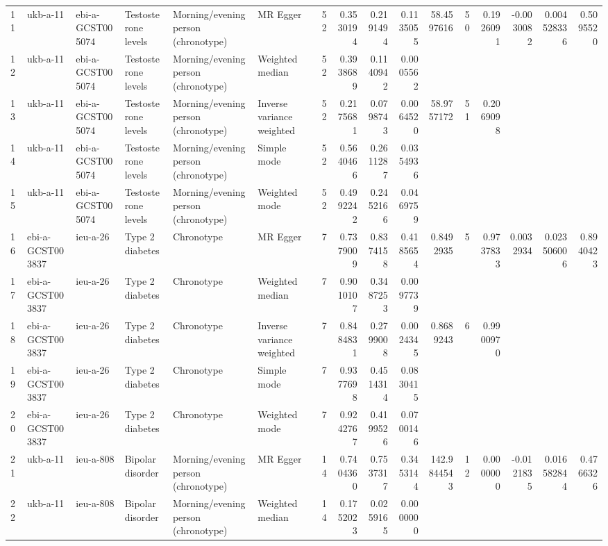 \begin{longtable}{llllllrrrrrrrrrr}
  11 & ukb-a-11 & ebi-a-GCST005074 & Testosterone levels & Morning/evening person (chronotype) & MR Egger & 52 & 0.3530194 & 0.2191494 & 0.1135055 & 58.4597616 & 50 & 0.1926091 & -0.0030082 & 0.004528336 & 0.5095520 \\ 
  12 & ukb-a-11 & ebi-a-GCST005074 & Testosterone levels & Morning/evening person (chronotype) & Weighted median & 52 & 0.3938689 & 0.1140942 & 0.0005562 &  &  &  &  &  &  \\ 
  13 & ukb-a-11 & ebi-a-GCST005074 & Testosterone levels & Morning/evening person (chronotype) & Inverse variance weighted & 52 & 0.2175681 & 0.0798743 & 0.0064520 & 58.9757172 & 51 & 0.2069098 &  &  &  \\ 
  14 & ukb-a-11 & ebi-a-GCST005074 & Testosterone levels & Morning/evening person (chronotype) & Simple mode & 52 & 0.5640466 & 0.2611287 & 0.0354936 &  &  &  &  &  &  \\ 
  15 & ukb-a-11 & ebi-a-GCST005074 & Testosterone levels & Morning/evening person (chronotype) & Weighted mode & 52 & 0.4992242 & 0.2452166 & 0.0469759 &  &  &  &  &  &  \\ 
  16 & ebi-a-GCST003837 & ieu-a-26 & Type 2 diabetes & Chronotype & MR Egger & 7 & 0.7379009 & 0.8374158 & 0.4185654 & 0.8492935 & 5 & 0.9737833 & 0.0032934 & 0.023506006 & 0.8940423 \\ 
  17 & ebi-a-GCST003837 & ieu-a-26 & Type 2 diabetes & Chronotype & Weighted median & 7 & 0.9010107 & 0.3487253 & 0.0097739 &  &  &  &  &  &  \\ 
  18 & ebi-a-GCST003837 & ieu-a-26 & Type 2 diabetes & Chronotype & Inverse variance weighted & 7 & 0.8484831 & 0.2799008 & 0.0024345 & 0.8689243 & 6 & 0.9900970 &  &  &  \\ 
  19 & ebi-a-GCST003837 & ieu-a-26 & Type 2 diabetes & Chronotype & Simple mode & 7 & 0.9377698 & 0.4514314 & 0.0830415 &  &  &  &  &  &  \\ 
  20 & ebi-a-GCST003837 & ieu-a-26 & Type 2 diabetes & Chronotype & Weighted mode & 7 & 0.9242767 & 0.4199526 & 0.0700146 &  &  &  &  &  &  \\ 
  21 & ukb-a-11 & ieu-a-808 & Bipolar disorder & Morning/evening person (chronotype) & MR Egger & 14 & 0.7404360 & 0.7537317 & 0.3453144 & 142.9844543 & 12 & 0.0000000 & -0.0121835 & 0.016582844 & 0.4766326 \\ 
  22 & ukb-a-11 & ieu-a-808 & Bipolar disorder & Morning/evening person (chronotype) & Weighted median & 14 & 0.1752023 & 0.0259165 & 0.0000000 &  &  &  &  &  &  \\ 

\end{longtable}

